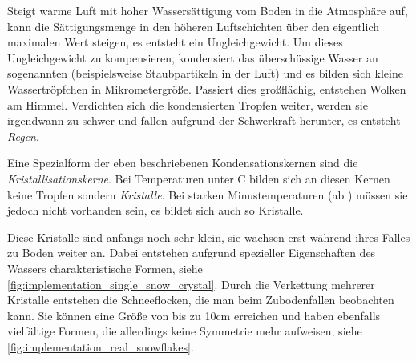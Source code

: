 Steigt warme Luft mit hoher Wassersättigung vom Boden in die
Atmosphäre auf, kann die Sättigungsmenge in den höheren Luftschichten
über den eigentlich maximalen Wert steigen, es entsteht ein
Ungleichgewicht. Um dieses Ungleichgewicht zu kompensieren, kondensiert
das überschüssige Wasser an sogenannten
 (beispielsweise Staubpartikeln in
der Luft) und es bilden sich kleine Wassertröpfchen in
Mikrometergröße. Passiert dies großflächig, entstehen Wolken am
Himmel. Verdichten sich die kondensierten Tropfen weiter, werden sie
irgendwann zu schwer und fallen aufgrund der Schwerkraft herunter, es
entsteht \emph{Regen}.

Eine Spezialform der eben beschriebenen Kondensationskernen sind die
\emph{Kristallisationskerne}. Bei Temperaturen unter 
C bilden sich an diesen Kernen keine Tropfen sondern \emph{Kristalle}.
Bei starken Minustemperaturen (ab ) müssen sie
jedoch nicht vorhanden sein, es bildet sich auch so Kristalle.

Diese Kristalle sind anfangs noch sehr klein, sie wachsen erst während ihres
Falles zu Boden weiter an. Dabei entstehen aufgrund spezieller
Eigenschaften des Wassers charakteristische Formen, siehe
\autoref{fig:implementation_single_snow_crystal}. Durch die Verkettung
mehrerer Kristalle entstehen die Schneeflocken, die man beim
Zubodenfallen beobachten kann. Sie können eine Größe von bis zu 10cm
erreichen\cite{Nau96} und haben ebenfalls vielfältige Formen, die
allerdings keine Symmetrie mehr aufweisen, siehe
\autoref{fig:implementation_real_snowflakes}.

